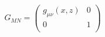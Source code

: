 \begin{equation}
G_{M N} = \left( \begin{array}{cc} g_{\mu \nu} ( x , z ) & 0 \\
0 & 1 \\ \end{array} \right)
\end{equation}

